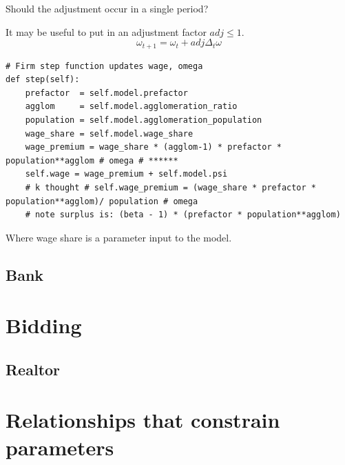 Should the adjustment occur in a single period?

It may be useful to put in an adjustment factor $adj \le 1$.
\[\omega_{t+1}=\omega_{t} + adj \Delta_t  \omega\]




\begin{lstlisting}
# Firm step function updates wage, omega
def step(self):
    prefactor  = self.model.prefactor
    agglom     = self.model.agglomeration_ratio
    population = self.model.agglomeration_population
    wage_share = self.model.wage_share  
    wage_premium = wage_share * (agglom-1) * prefactor * population**agglom # omega # ****** 
    self.wage = wage_premium + self.model.psi
    # k thought # self.wage_premium = (wage_share * prefactor * population**agglom)/ population # omega    
    # note surplus is: (beta - 1) * (prefactor * population**agglom)
\end{lstlisting}

Where wage share is a parameter input to the model.


\subsection{Bank}\label{Parameters for Mortgages}


\section{Bidding}


\subsection{Realtor}


\newpage

\section{Relationships that constrain parameters }

